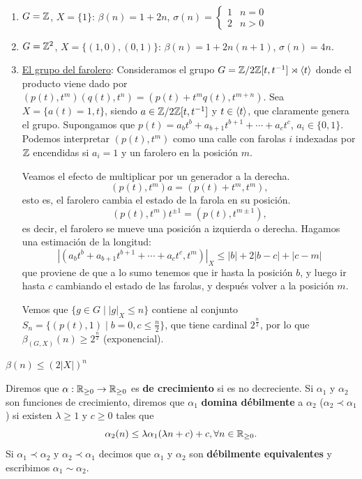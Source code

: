 \documentclass[twoside, 11pt]{article}
\begin{document}
\begin{ejs}\
\begin{enumerate}
\item $G=\mathbb{Z}$, $X=\{1\}$: $\beta(n)=1+2n$, $\sigma(n)=\begin{cases}
1 & n=0\\
2 & n>0
\end{cases}$
\item $G=\mathbb{Z}^2$, $X=\{(1,0),(0,1)\}$: $\beta(n)=1+2n(n+1)$, $\sigma(n)=4n$. 
\item \underline{El grupo del farolero}: Consideramos el grupo $G=\mathbb{Z}/2\mathbb{Z}[t,t^{-1}]\rtimes\langle{t}\rangle$ donde el producto viene dado por $(p(t),t^m)(q(t),t^n)=(p(t)+t^mq(t),t^{m+n})$. Sea $X=\{a(t)=1, t\}$, siendo $a\in \mathbb{Z}/2\mathbb{Z}[t,t^{-1}]$ y $t\in \langle{t}\rangle$, que claramente genera el grupo. Supongamos que $p(t)=a_bt^b+a_{b+1}t^{b+1}+\cdots +a_ct^c$, $a_i\in\{0,1\}$. Podemos interpretar $(p(t),t^m)$ como una calle con farolas $i$ indexadas por $\mathbb{Z}$ encendidas si $a_i=1$ y un farolero en la posición $m$. 

Veamos el efecto de multiplicar por un generador a la derecha. 
\[
(p(t), t^m)a=(p(t)+t^m,t^m),
\]
esto es, el farolero cambia el estado de la farola en su posición.
\[
(p(t), t^m)t^{\pm 1}=(p(t), t^{m\pm 1}),
\]
es decir, el farolero se mueve una posición a izquierda o derecha. Hagamos una estimación de la longitud:
\[
|(a_bt^b+a_{b+1}t^{b+1}+\cdots +a_ct^c,t^m)|_X\leq |b|+2|b-c|+|c-m|
\]
que proviene de que a lo sumo tenemos que ir hasta la posición $b$, y luego ir hasta $c$ cambiando el estado de las farolas, y después volver a la posición $m$. 

Vemos que $\{g\in G\mid |g|_X\leq n\}$ contiene al conjunto $S_n=\{(p(t), 1)\mid b=0, c\leq \frac{n}{2}\}$, que tiene cardinal $2^{\frac{n}{2}}$, por lo que $\beta_{(G,X)}(n)\geq 2^{\frac{n}{2}}$ (exponencial).  
\end{enumerate}
\end{ejs}

\begin{observacion}
$\beta(n)\leq (2|X|)^n$
\end{observacion}

\begin{defi}
Diremos que $\alpha:\mathbb{R}_{\geq 0}\to\mathbb{R}_{\geq 0}$ es \textbf{de crecimiento} si es no decreciente. Si $\alpha_1$ y $\alpha_2$ son funciones de crecimiento, diremos que $\alpha_1$ \textbf{domina débilmente} a $\alpha_2$ ($\alpha_2\prec \alpha_1$) si existen $\lambda\geq 1$ y $c\geq 0$ tales que
\[
\alpha_2(n)\leq \lambda\alpha_1(\lambda n+c)+c, \forall n\in\mathbb{R}_{\geq 0}.
\]
Si $\alpha_1\prec\alpha_2$ y $\alpha_2\prec\alpha_1$ decimos que $\alpha_1$ y $\alpha_2$ son \textbf{débilmente equivalentes} y escribimos $\alpha_1\sim\alpha_2$.
\end{defi}
\end{document}
